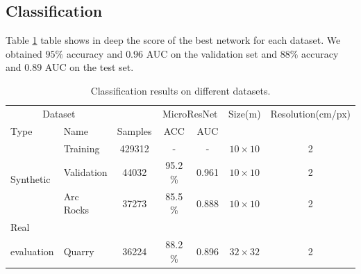 \documentclass[../document.tex]{subfiles}
\begin{document}
\subsection{Classification}
Table \ref{tab : classification-results} table shows in deep the score of the best network for each dataset. We obtained $95\%$ accuracy and $0.96$ AUC on the validation set and $88\%$ accuracy and $0.89$ AUC on the test set.
\begin{table}[htbp]
    \centering
    \begin{tabular}{@{}llccccc@{}}
    \toprule
    \multicolumn{2}{c}{Dataset} && \multicolumn{2}{c}{MicroResNet} & Size(m) & Resolution(cm/px) \\
    \cmidrule{1-2} \cmidrule{4-5}
    Type     &  Name  & Samples & ACC  &  AUC    & & \\
    \toprule
      \multirow{3}{*}{Synthetic}  & Training   & 429312 & - & - & $10\times10$ & 2\\
      &  Validation   & 44032 &  95.2 \% &  0.961 & $10\times10$ & 2 \\
      & Arc Rocks & 37273 &  85.5 \% &  0.888 & $10\times10$ & 2 \\
      \cmidrule{2-7}
    Real\\evaluation & Quarry & 36224 &  88.2 \%&  0.896& $32\times32$ & 2\\
    \bottomrule   
\end{tabular}
\caption{Classification results on different datasets.}
\label{tab : classification-results}
\end{table}
\end{document}
